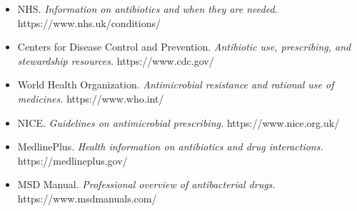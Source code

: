 \begin{itemize}
    \item NHS. \textit{Information on antibiotics and when they are needed.} https://www.nhs.uk/conditions/
    \item Centers for Disease Control and Prevention. \textit{Antibiotic use, prescribing, and stewardship resources.} https://www.cdc.gov/
    \item World Health Organization. \textit{Antimicrobial resistance and rational use of medicines.} https://www.who.int/
    \item NICE. \textit{Guidelines on antimicrobial prescribing.} https://www.nice.org.uk/
    \item MedlinePlus. \textit{Health information on antibiotics and drug interactions.} https://medlineplus.gov/
    \item MSD Manual. \textit{Professional overview of antibacterial drugs.} https://www.msdmanuals.com/
\end{itemize}
